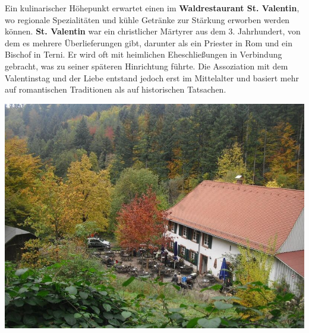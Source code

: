 \documentclass[landscape, a4paper]{article}
\newcommand\alert[1]{\textcolor{PrimaryColor}{\textbf{#1}}}
\begin{document}
\begin{minipage}[t]{0.31\textwidth}
\end{minipage}%
\hfill\color{white}%
\vrule width 0.01cm
\hfill\color{black}%
\begin{minipage}[t]{0.31\textwidth}
	\vspace{0cm}
	\setlength{\parskip}{0.25cm}

	Ein kulinarischer Höhepunkt erwartet einen im \alert{Waldrestaurant St. Valentin}, wo regionale Spezialitäten und kühle Getränke zur Stärkung erworben werden können. \alert{St. Valentin} war ein christlicher Märtyrer aus dem 3. Jahrhundert, von dem es mehrere Überlieferungen gibt, darunter als ein Priester in Rom und ein Bischof in Terni. Er wird oft mit heimlichen Eheschließungen in Verbindung gebracht, was zu seiner späteren Hinrichtung führte. Die Assoziation mit dem Valentinstag und der Liebe entstand jedoch erst im Mittelalter und basiert mehr auf romantischen Traditionen als auf historischen Tatsachen.

	\includegraphics[width=\linewidth]{./figures/stvalentin.png}
	\setlength{\parskip}{0.25cm}


\end{minipage}
\end{document}
